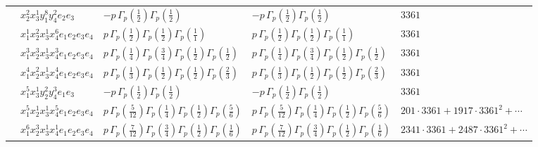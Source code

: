 \documentclass[11pt]{article}
\begin{document}
\begin{table}[ht]
{\begin{tabular}{@{}lllll@{}}
 & $x_{2}^{2} x_{3}^{1} y_{1}^{8} y_{4}^{2} e_{2} e_{3}$ & $- p \, \Gamma_p \left( \frac{1}{2} \right) \Gamma_p \left( \frac{1}{2} \right)$ & $- p \, \Gamma_p \left( \frac{1}{2} \right) \Gamma_p \left( \frac{1}{2} \right)$ & $3361$ \\
 & $x_{1}^{1} x_{2}^{2} x_{3}^{1} x_{4}^{6}  e_{1} e_{2} e_{3} e_{4}$ & $p \, \Gamma_p \left( \frac{1}{2} \right) \Gamma_p \left( \frac{1}{2} \right) \Gamma_p \left( \frac{1}{1} \right)$ & $p \, \Gamma_p \left( \frac{1}{2} \right) \Gamma_p \left( \frac{1}{2} \right) \Gamma_p \left( \frac{1}{1} \right)$ & $3361$ \\
 & $x_{1}^{3} x_{2}^{3} x_{3}^{1} x_{4}^{3}  e_{1} e_{2} e_{3} e_{4}$ & $p \, \Gamma_p \left( \frac{1}{4} \right) \Gamma_p \left( \frac{3}{4} \right) \Gamma_p \left( \frac{1}{2} \right) \Gamma_p \left( \frac{1}{2} \right)$ & $p \, \Gamma_p \left( \frac{1}{4} \right) \Gamma_p \left( \frac{3}{4} \right) \Gamma_p \left( \frac{1}{2} \right) \Gamma_p \left( \frac{1}{2} \right)$ & $3361$ \\
 & $x_{1}^{4} x_{2}^{2} x_{3}^{1} x_{4}^{4}  e_{1} e_{2} e_{3} e_{4}$ & $p \, \Gamma_p \left( \frac{1}{3} \right) \Gamma_p \left( \frac{1}{2} \right) \Gamma_p \left( \frac{1}{2} \right) \Gamma_p \left( \frac{2}{3} \right)$ & $p \, \Gamma_p \left( \frac{1}{3} \right) \Gamma_p \left( \frac{1}{2} \right) \Gamma_p \left( \frac{1}{2} \right) \Gamma_p \left( \frac{2}{3} \right)$ & $3361$ \\
 & $x_{1}^{5} x_{3}^{1} y_{2}^{2} y_{4}^{3} e_{1} e_{3}$ & $- p \, \Gamma_p \left( \frac{1}{2} \right) \Gamma_p \left( \frac{1}{2} \right)$ & $- p \, \Gamma_p \left( \frac{1}{2} \right) \Gamma_p \left( \frac{1}{2} \right)$ & $3361$ \\
 & $x_{1}^{5} x_{2}^{1} x_{3}^{1} x_{4}^{5}  e_{1} e_{2} e_{3} e_{4}$ & $p \, \Gamma_p \left( \frac{5}{12} \right) \Gamma_p \left( \frac{1}{4} \right) \Gamma_p \left( \frac{1}{2} \right) \Gamma_p \left( \frac{5}{6} \right)$ & $p \, \Gamma_p \left( \frac{5}{12} \right) \Gamma_p \left( \frac{1}{4} \right) \Gamma_p \left( \frac{1}{2} \right) \Gamma_p \left( \frac{5}{6} \right)$ & $201{\cdot}3361{+}1917{\cdot}3361^{2}{+}\cdots$ \\
 & $x_{1}^{6} x_{2}^{3} x_{3}^{1} x_{4}^{1}  e_{1} e_{2} e_{3} e_{4}$ & $p \, \Gamma_p \left( \frac{7}{12} \right) \Gamma_p \left( \frac{3}{4} \right) \Gamma_p \left( \frac{1}{2} \right) \Gamma_p \left( \frac{1}{6} \right)$ & $p \, \Gamma_p \left( \frac{7}{12} \right) \Gamma_p \left( \frac{3}{4} \right) \Gamma_p \left( \frac{1}{2} \right) \Gamma_p \left( \frac{1}{6} \right)$ & $2341{\cdot}3361{+}2487{\cdot}3361^{2}{+}\cdots$ \\

\end{tabular}}
\end{table}
\end{document}
